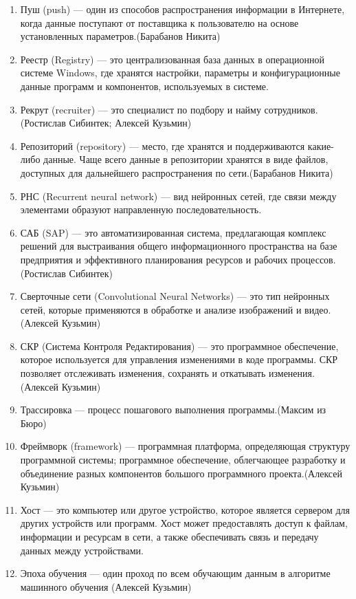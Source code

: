 \documentclass{article}
\begin{document}
\begin{enumerate}
    \item Пуш (push) --- один из способов распространения информации в Интернете, когда данные поступают от поставщика к пользователю на основе установленных параметров.(Барабанов Никита)
    \item Реестр (Registry) --- это централизованная база данных в операционной системе Windows, где хранятся настройки, параметры и конфигурационные данные программ и компонентов, используемых в системе.
    \item Рекрут (recruiter) --- это специалист по подбору и найму сотрудников. (Ростислав Сибинтек; Алексей Кузьмин)
    \item Репозиторий (repository) --- место, где хранятся и поддерживаются какие-либо данные. Чаще всего данные в репозитории хранятся в виде файлов, доступных для дальнейшего распространения по сети.(Барабанов Никита)
    \item РНС (Recurrent neural network) --- вид нейронных сетей, где связи между элементами образуют направленную последовательность.
    \item САБ (SAP) --- это автоматизированная система, предлагающая комплекс решений для выстраивания общего информационного пространства на базе предприятия и эффективного планирования ресурсов и рабочих процессов. (Ростислав Сибинтек)
    \item Сверточные сети  (Convolutional Neural Networks) --- это тип нейронных сетей, которые применяются в обработке и анализе изображений и видео. (Алексей Кузьмин)
    \item СКР (Система Контроля Редактирования) --- это программное обеспечение, которое используется для управления изменениями в коде программы. СКР позволяет отслеживать изменения, сохранять и откатывать изменения. (Алексей Кузьмин)
    \item Трассировка --- процесс пошагового выполнения программы.(Максим из Бюро)
    \item Фреймворк (framework) --- программная платформа, определяющая структуру программной системы; программное обеспечение, облегчающее разработку и объединение разных компонентов большого программного проекта.(Алексей Кузьмин)
    \item Хост --- это компьютер или другое устройство, которое является сервером для других устройств или программ. Хост может предоставлять доступ к файлам, информации и ресурсам в сети, а также обеспечивать связь и передачу данных между устройствами.
    \item Эпоха обучения --- один проход по всем обучающим данным в алгоритме машинного обучения (Алексей Кузьмин)
\end{enumerate}
\end{document}
